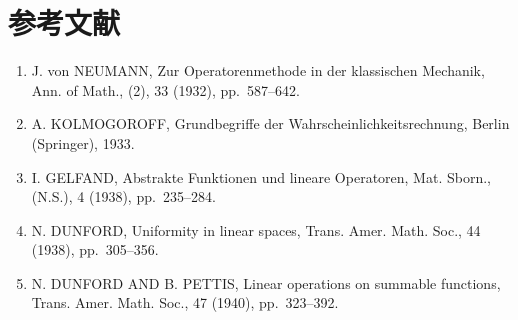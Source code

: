 \chapter*{参考文献}
{}

\begin{enumerate}
\def\labelenumi{(\Roman{enumi})}
\item
  J. von NEUMANN, Zur Operatorenmethode in der klassischen Mechanik, Ann. of Math., (2), 33 (1932), pp.~587--642.
\item
  A. KOLMOGOROFF, Grundbegriffe der Wahrscheinlichkeitsrechnung, Berlin (Springer), 1933.
\item
  I. GELFAND, Abstrakte Funktionen und lineare Operatoren, Mat. Sborn., (N.S.), 4 (1938), pp.~235--284.
\item
  N. DUNFORD, Uniformity in linear spaces, Trans. Amer. Math. Soc., 44 (1938), pp.~305--356.
\item
  N. DUNFORD AND B. PETTIS, Linear operations on summable functions, Trans. Amer. Math. Soc., 47 (1940), pp.~323--392.
\end{enumerate}

